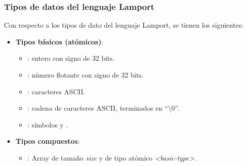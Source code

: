 \subsubsection{Tipos de datos del lenguaje Lamport}
Con respecto a los tipos de dato del lenguaje Lamport, se tienen los siguientes:
\begin{itemize}
    \item \textbf{Tipos básicos (atómicos)}:
    \begin{itemize}
        \item {}: entero con signo de 32 bits.
        \item {}: número flotante con signo de 32 bits.
        \item {}: caracteres ASCII.
        \item {}: cadena de caracteres ASCII, terminados en ``\textbackslash 0''.
        \item {}: símbolos  y .
    \end{itemize}
    \item \textbf{Tipos compuestos}:
    \begin{itemize}
        \item {}: Array de tamaño \textit{size} y de tipo atómico \textit{<basic-type>}.
    \end{itemize}
\end{itemize}


